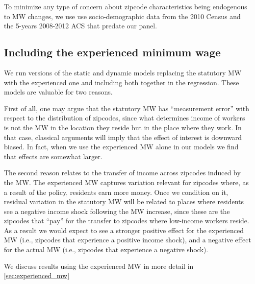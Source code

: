To minimize any type of concern about zipcode characteristics being endogenous to MW changes, 
we use use socio-demographic data from the 2010 Census and the 5-years 2008-2012 ACS that 
predate our panel.


\subsection{Including the experienced minimum wage}\label{sec:emp_strategy_expmw}

We run versions of the static and dynamic models replacing the statutory MW with the 
experienced one and including both together in the regression. These models are valuable 
for two reasons.

First of all, one may argue that the statutory MW has ``measurement error'' with respect 
to the distribution of zipcodes, since what determines income of workers is not the MW
in the location they reside but in the place where they work. In that case, classical
arguments will imply that the effect of interest is downward biased. In fact, when we 
use the experienced MW alone in our models we find that effects are somewhat larger.

The second reason relates to the transfer of income across zipcodes induced by the MW.
The experienced MW captures variation relevant for zipcodes where, as a result of the 
policy, residents earn more money. Once we condition on it, residual variation in the
statutory MW will be related to places where residents see a negative income shock
following the MW increase, since these are the zipcodes that ``pay'' for the transfer
to zipcodes where low-income workers reside. As a result we would expect to see
a stronger positive effect for the experienced MW (i.e., zipcodes that experience a 
positive income shock), and a negative effect for the actual MW (i.e., zipcodes that 
experience a negative shock).

We discuss results using the experienced MW in more detail in \autoref{sec:experienced_mw}




